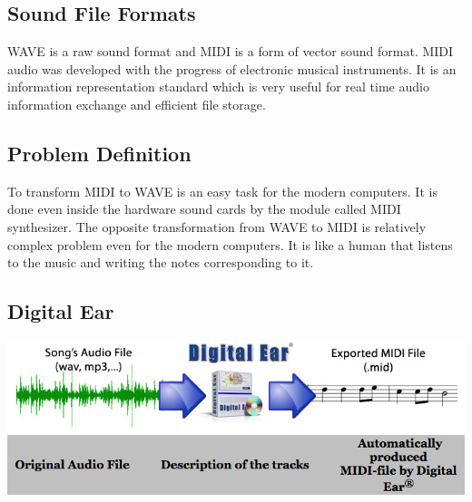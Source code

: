 \documentclass[a0,portrait,25pt]{sciposter}
\begin{document}
\begin{multicols}{3}

\begin{mdframed}[backgroundcolor=white,roundcorner=4pt,shadow=true,linewidth=1pt]
\color{Black}
\section*{Sound File Formats}
WAVE is a raw sound format and MIDI is a form of vector sound format. MIDI audio was developed with the progress of electronic musical instruments. It is an information representation standard which is very useful for real time audio information exchange and efficient file storage. 
\end{mdframed}

\begin{mdframed}[backgroundcolor=white,roundcorner=4pt,shadow=true,linewidth=1pt]
\color{Black}
\section*{Problem Definition}
To transform MIDI to WAVE is an easy task for the modern computers. It is done even inside the hardware sound cards by the module called MIDI synthesizer. The opposite transformation from WAVE to MIDI is relatively complex problem even for the modern computers. It is like a human that listens to the music and writing the notes corresponding to it. 
\end{mdframed}
 
\begin{mdframed}[backgroundcolor=white,roundcorner=4pt,shadow=true,linewidth=1pt]
\section*{Digital Ear \textregistered}
\begin{minipage}[c]{1\linewidth}
\includegraphics[width=1.0\linewidth]{pic002}
\end{minipage}
\end{mdframed} 


\end{multicols}
\end{document}

